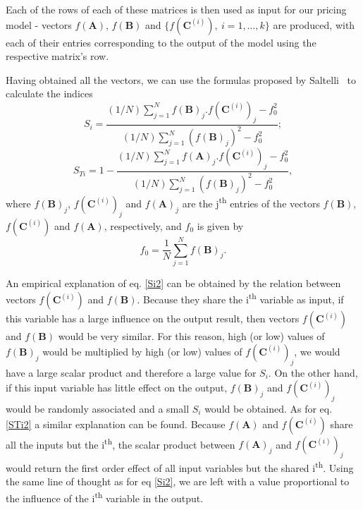 \documentclass[a4paper,twocolumn,aps,prd,longbibliography,superscriptaddress]{revtex4-1}
\begin{document}
Each of the rows of each of these matrices is then used as input for our pricing model - vectors $f(\mathbf{A})$, $f(\mathbf{B})$ and $\{f(\mathbf{C}^{(i)}),\ i=1,\dots,k\}$ are produced, with each of their entries corresponding to the output of the model using the respective matrix's row.

Having obtained all the vectors, we can use the formulas proposed by Saltelli~\cite{Saltelli} to calculate the indices
\begin{equation}\label{Si2}
S_i=\frac{(1/N)\sum_{j=1}^Nf(\mathbf{B})_j.f(\mathbf{C}^{(i)})_j-f_0^2}{(1/N)\sum_{j=1}^N\left(f(\mathbf{B})_j\right)^2-f_0^2};
\end{equation}
\begin{equation}\label{STi2}
S_{Ti}=1-\frac{(1/N)\sum_{j=1}^Nf(\mathbf{A})_j.f(\mathbf{C}^{(i)})_j-f_0^2}{(1/N)\sum_{j=1}^N\left(f(\mathbf{B})_j\right)^2-f_0^2},
\end{equation}
\noindent where $f(\mathbf{B})_j$, $f(\mathbf{C}^{(i)})_j$ and $f(\mathbf{A})_j$ are the j\textsuperscript{th} entries of the vectors $f(\mathbf{B})$, $f(\mathbf{C}^{(i)})$ and $f(\mathbf{A})$, respectively, and $f_0$ is given by
\begin{equation}
f_0=\frac{1}{N}\sum_{j=1}^Nf(\mathbf{B})_j.
\end{equation}

An empirical explanation of eq. \eqref{Si2} can be obtained by the relation between vectors $f(\mathbf{C}^{(i)})$ and $f(\mathbf{B})$. Because they share the i\textsuperscript{th} variable as input, if this variable has a large influence on the output result, then vectors $f(\mathbf{C}^{(i)})$ and $f(\mathbf{B})$ would be very similar. For this reason, high (or low) values of $f(\mathbf{B})_j$ would be multiplied by high (or low) values of $f(\mathbf{C}^{(i)})_j$, we would have a large scalar product and therefore a large value for $S_i$. On the other hand, if this input variable has little effect on the output, $f(\mathbf{B})_j$ and $f(\mathbf{C}^{(i)})_j$ would be randomly associated and a small $S_i$ would be obtained.
As for eq. \eqref{STi2} a similar explanation can be found. Because $f(\mathbf{A})$ and $f(\mathbf{C}^{(i)})$ share all the inputs but the i\textsuperscript{th}, the scalar product between $f(\mathbf{A})_j$ and $f(\mathbf{C}^{(i)})_j$ would return the first order effect of all input variables but the shared i\textsuperscript{th}. Using the same line of thought as for eq \eqref{Si2}, we are left with a value proportional to the influence of the i\textsuperscript{th} variable in the output.
\end{document}
